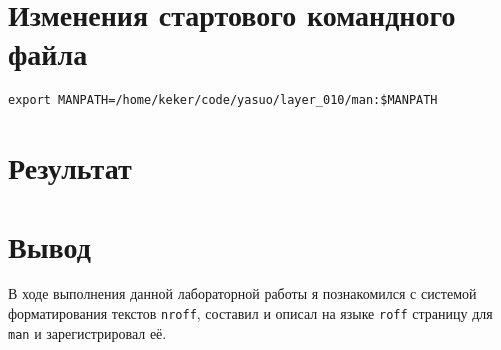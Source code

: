 \documentclass[12pt, a4paper]{article}
\begin{document}
\section{Изменения стартового командного файла}
\begin{verbatim}
export MANPATH=/home/keker/code/yasuo/layer_010/man:$MANPATH
\end{verbatim}

\section{Результат}
{\scriptsize }

\section{Вывод}
В ходе выполнения данной лабораторной работы я познакомился с системой
форматирования текстов \texttt{nroff}, составил и описал на языке \texttt{roff}
страницу для \texttt{man} и зарегистрировал её.
\end{document}
